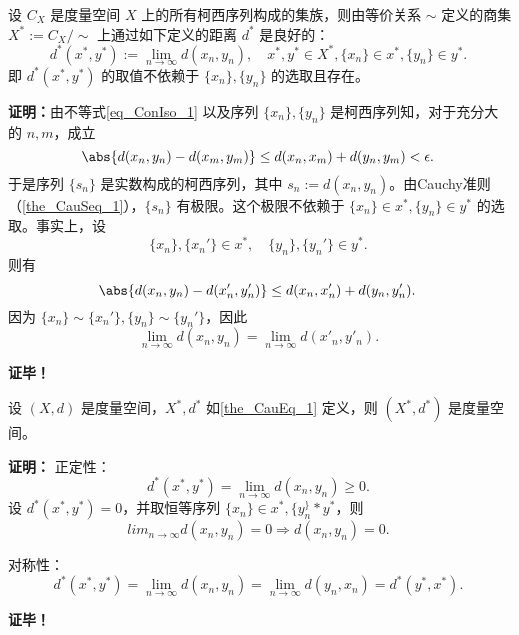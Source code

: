 \begin{theorem}{}\label{the_CauEq_1}
设 $C_X$ 是度量空间 $X$ 上的所有柯西序列构成的集族，则由等价关系 $\sim$ 定义的商集 $X^*:=C_X/\sim$ 上通过如下定义的距离 $d^*$ 是良好的：
\begin{equation}
d^*(x^*,y^*):=\lim_{n\rightarrow\infty} d(x_n,y_n),\quad x^*,y^*\in X^*,\{x_n\}\in x^*,\{y_n\}\in y^*.~
\end{equation}
即 $d^*(x^*,y^*)$ 的取值不依赖于 $\{x_n\},\{y_n\}$ 的选取且存在。
\end{theorem}
\textbf{证明：}由不等式\autoref{eq_ConIso_1} 以及序列 $\{x_n\},\{y_n\}$ 是柯西序列知，对于充分大的 $n,m$，成立
\begin{equation}
\abs{d(x_n,y_n)-d(x_m,y_m)}\leq d(x_n,x_m)+d(y_n,y_m)<\epsilon.~
\end{equation}
于是序列 $\{s_n\}$ 是实数构成的柯西序列，其中 $s_n:=d(x_n,y_n)$。由Cauchy准则（\autoref{the_CauSeq_1}），$\{s_n\}$ 有极限。这个极限不依赖于 $\{x_n\}\in x^*,\{y_n\}\in y^*$ 的选取。事实上，设
\begin{equation}
\{x_n\},\{x_n'\}\in x^*,\quad \{y_n\},\{y_n'\}\in y^*.~
\end{equation}
则有
\begin{equation}
\abs{d(x_n,y_n)-d(x'_n,y'_n)}\leq d(x_n,x_n')+d(y_n,y'_n).~
\end{equation}
因为 $\{x_n\}\sim\{x_n'\},\{y_n\}\sim\{y_n'\}$，因此
\begin{equation}
\lim_{n\rightarrow\infty}d(x_n,y_n)=\lim_{n\rightarrow\infty}d(x'_n,y'_n).~
\end{equation}

\textbf{证毕！}

\begin{theorem}{}
设 $(X,d)$ 是度量空间，$X^*,d^*$ 如\autoref{the_CauEq_1} 定义，则 $(X^*,d^*)$ 是度量空间。
\end{theorem}

\textbf{证明：}
正定性：
\begin{equation}
d^*(x^*,y^*)=\lim_{n\rightarrow\infty} d(x_n,y_n)\geq0.~
\end{equation}
设 $d^*(x^*,y^*)=0$，并取恒等序列 $\{x_n\}\in x^*,\{y_n^\}* y^*$，则
\begin{equation}
lim_{n\rightarrow\infty} d(x_n,y_n)=0\Rightarrow d(x_n,y_n)=0.~
\end{equation}


对称性：
\begin{equation}
d^*(x^*,y^*)=\lim_{n\rightarrow\infty} d(x_n,y_n)=\lim_{n\rightarrow\infty} d(y_n,x_n)=d^*(y^*,x^*).~
\end{equation}

\textbf{证毕！}


